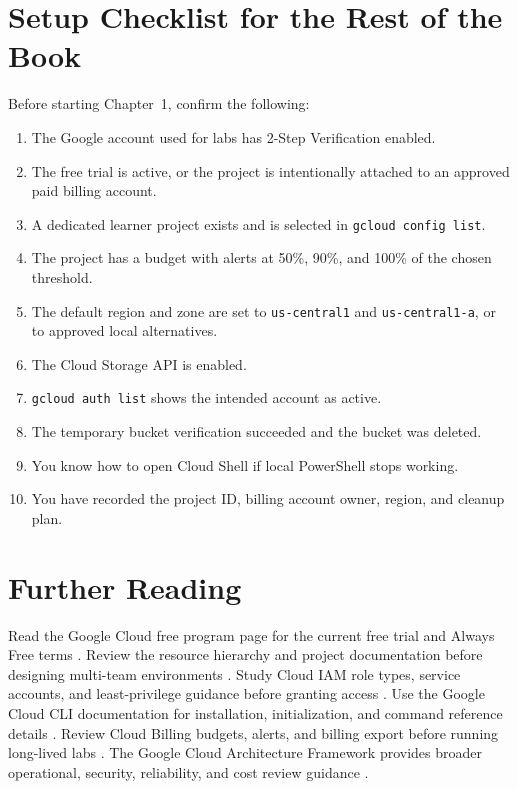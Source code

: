 \section{Setup Checklist for the Rest of the Book}
Before starting Chapter~1, confirm the following:

\begin{enumerate}
    \item The Google account used for labs has 2-Step Verification enabled.
    \item The free trial is active, or the project is intentionally attached to an approved paid billing account.
    \item A dedicated learner project exists and is selected in \texttt{gcloud config list}.
    \item The project has a budget with alerts at 50\%, 90\%, and 100\% of the chosen threshold.
    \item The default region and zone are set to \texttt{us-central1} and \texttt{us-central1-a}, or to approved local alternatives.
    \item The Cloud Storage API is enabled.
    \item \texttt{gcloud auth list} shows the intended account as active.
    \item The temporary bucket verification succeeded and the bucket was deleted.
    \item You know how to open Cloud Shell if local PowerShell stops working.
    \item You have recorded the project ID, billing account owner, region, and cleanup plan.
\end{enumerate}

\section{Further Reading}
Read the Google Cloud free program page for the current free trial and Always Free terms \cite{googlecloudfreeprogram}. Review the resource hierarchy and project documentation before designing multi-team environments \cite{googlecloudresourcehierarchy}. Study Cloud IAM role types, service accounts, and least-privilege guidance before granting access \cite{googlecloudiamoverview}. Use the Google Cloud CLI documentation for installation, initialization, and command reference details \cite{googlecloudclioverview}. Review Cloud Billing budgets, alerts, and billing export before running long-lived labs \cite{googlecloudbillingdocs}. The Google Cloud Architecture Framework provides broader operational, security, reliability, and cost review guidance \cite{googlecloudarchitectureframework}.

